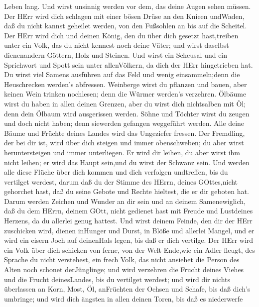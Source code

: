 Leben lang.  Und wirst unsinnig werden vor dem, das deine
Augen sehen müssen.  Der HErr wird dich schlagen mit einer
bösen Drüse an den Knieen undWaden, daß du nicht kannst geheilet werden,
von den Fußsohlen an bis auf die Scheitel.  Der HErr wird
dich und deinen König, den du über dich gesetzt hast,treiben unter ein
Volk, das du nicht kennest noch deine Väter; und wirst daselbst
dienenandern Göttern, Holz und Steinen.  Und wirst ein
Scheusal und ein Sprichwort und Spott sein unter allenVölkern, da dich
der HErr hingetrieben hat.  Du wirst viel Samens ausführen
auf das Feld und wenig einsammeln;denn die Heuschrecken werden's
abfressen.  Weinberge wirst du pflanzen und bauen, aber
keinen Wein trinken nochlesen; denn die Würmer werden's verzehren.
 Ölbäume wirst du haben in allen deinen Grenzen, aber du
wirst dich nichtsalben mit Öl; denn dein Ölbaum wird ausgerissen werden.
 Söhne und Töchter wirst du zeugen und doch nicht haben;
denn siewerden gefangen weggeführt werden.  Alle deine
Bäume und Früchte deines Landes wird das Ungeziefer fressen.
 Der Fremdling, der bei dir ist, wird über dich steigen und
immer obenschweben; du aber wirst heruntersteigen und immer unterliegen.
 Er wird dir leihen, du aber wirst ihm nicht leihen; er
wird das Haupt sein,und du wirst der Schwanz sein.  Und
werden alle diese Flüche über dich kommen und dich verfolgen undtreffen,
bis du vertilget werdest, darum daß du der Stimme des HErrn, deines
GOttes,nicht gehorchet hast, daß du seine Gebote und Rechte hieltest,
die er dir geboten hat.  Darum werden Zeichen und Wunder an
dir sein und an deinem Samenewiglich,  daß du dem HErrn,
deinem GOtt, nicht gedienet hast mit Freude und Lustdeines Herzens, da
du allerlei genug hattest.  Und wirst deinem Feinde, den
dir der HErr zuschicken wird, dienen inHunger und Durst, in Blöße und
allerlei Mangel, und er wird ein eisern Joch auf deinenHals legen, bis
daß er dich vertilge.  Der HErr wird ein Volk über dich
schicken von ferne, von der Welt Ende,wie ein Adler fleugt, des Sprache
du nicht verstehest,  ein frech Volk, das nicht ansiehet
die Person des Alten noch schonet derJünglinge;  und wird
verzehren die Frucht deines Viehes und die Frucht deinesLandes, bis du
vertilget werdest; und wird dir nichts überlassen an Korn, Most, Öl,
anFrüchten der Ochsen und Schafe, bis daß dich's umbringe; 
und wird dich ängsten in allen deinen Toren, bis daß es niederwerfe
